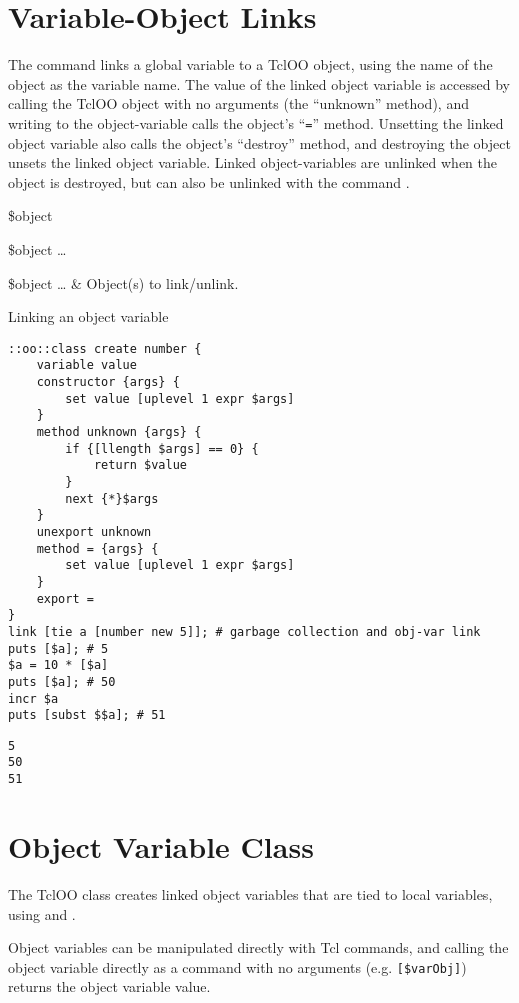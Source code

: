 \documentclass{article}
\begin{document}
\section{Variable-Object Links}
The command  links a global variable to a TclOO object, using the name of the object as the variable name. 
The value of the linked object variable is accessed by calling the TclOO object with no arguments (the ``unknown'' method), and writing to the object-variable calls the object's ``\texttt{=}'' method. 
Unsetting the linked object variable also calls the object's ``destroy'' method, and destroying the object unsets the linked object variable.
Linked object-variables are unlinked when the object is destroyed, but can also be unlinked with the command .
\begin{syntax}
 \$object
\end{syntax}
\begin{syntax}
 \$object …
\end{syntax}
\begin{args}
\$object … & Object(s) to link/unlink.
\end{args}
\begin{example}{Linking an object variable}
\begin{lstlisting}
::oo::class create number {
    variable value
    constructor {args} {
        set value [uplevel 1 expr $args]
    }
    method unknown {args} {
        if {[llength $args] == 0} {
            return $value
        }
        next {*}$args
    }
    unexport unknown
    method = {args} {
        set value [uplevel 1 expr $args]
    }
    export =
}
link [tie a [number new 5]]; # garbage collection and obj-var link
puts [$a]; # 5
$a = 10 * [$a]
puts [$a]; # 50
incr $a
puts [subst $$a]; # 51
\end{lstlisting}
\tcblower
\begin{lstlisting}
5
50
51
\end{lstlisting}
\end{example}
\clearpage
\section{Object Variable Class}
The TclOO class  creates linked object variables that are tied to local variables, using  and .

Object variables can be manipulated directly with Tcl commands, and calling the object variable directly as a command with no arguments (e.g. \texttt{[\$varObj]}) returns the object variable value.
\end{document}
